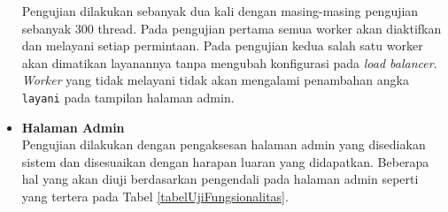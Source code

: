 \documentclass{ta-its}
\begin{document}
\begin{itemize}
					Pengujian dilakukan sebanyak dua kali dengan masing-masing pengujian sebanyak 300 thread. Pada pengujian pertama semua worker akan diaktifkan dan melayani setiap permintaan. Pada pengujian kedua salah satu worker akan dimatikan layanannya tanpa mengubah konfigurasi pada \textit{load balancer}. \textit{Worker} yang tidak melayani tidak akan mengalami penambahan angka \texttt{layani} pada tampilan halaman admin.
					
					
					\item \textbf{Halaman Admin} \\
					Pengujian dilakukan dengan pengaksesan halaman admin yang disediakan sistem dan disesuaikan dengan harapan luaran yang didapatkan. Beberapa hal yang akan diuji berdasarkan pengendali pada halaman admin seperti yang tertera pada Tabel \ref{tabelUjiFungsionalitas}.
				\end{itemize}
				
\end{document}
